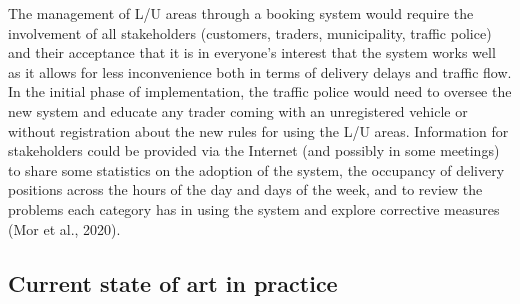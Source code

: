 \documentclass[
]{book}
\begin{document}
The management of L/U areas through a booking system would require the involvement of all stakeholders (customers, traders, municipality, traffic police) and their acceptance that it is in everyone's interest that the system works well as it allows for less inconvenience both in terms of delivery delays and traffic flow. In the initial phase of implementation, the traffic police would need to oversee the new system and educate any trader coming with an unregistered vehicle or without registration about the new rules for using the L/U areas. Information for stakeholders could be provided via the Internet (and possibly in some meetings) to share some statistics on the adoption of the system, the occupancy of delivery positions across the hours of the day and days of the week, and to review the problems each category has in using the system and explore corrective measures (Mor et al., 2020).

\hypertarget{current-state-of-art-in-practice-23}{%
\subsection*{Current state of art in practice}\label{current-state-of-art-in-practice-23}}
\end{document}
